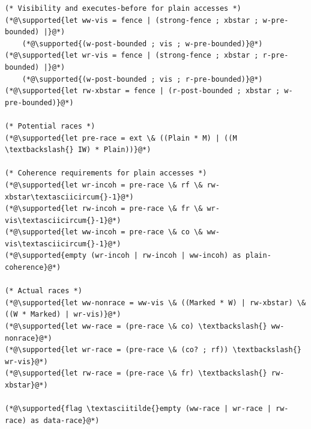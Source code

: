 \begin{lstlisting}
(* Visibility and executes-before for plain accesses *)
(*@\supported{let ww-vis = fence | (strong-fence ; xbstar ; w-pre-bounded) |}@*)
	(*@\supported{(w-post-bounded ; vis ; w-pre-bounded)}@*)
(*@\supported{let wr-vis = fence | (strong-fence ; xbstar ; r-pre-bounded) |}@*)
	(*@\supported{(w-post-bounded ; vis ; r-pre-bounded)}@*)
(*@\supported{let rw-xbstar = fence | (r-post-bounded ; xbstar ; w-pre-bounded)}@*)

(* Potential races *)
(*@\supported{let pre-race = ext \& ((Plain * M) | ((M \textbackslash{} IW) * Plain))}@*)

(* Coherence requirements for plain accesses *)
(*@\supported{let wr-incoh = pre-race \& rf \& rw-xbstar\textasciicircum{}-1}@*)
(*@\supported{let rw-incoh = pre-race \& fr \& wr-vis\textasciicircum{}-1}@*)
(*@\supported{let ww-incoh = pre-race \& co \& ww-vis\textasciicircum{}-1}@*)
(*@\supported{empty (wr-incoh | rw-incoh | ww-incoh) as plain-coherence}@*)

(* Actual races *)
(*@\supported{let ww-nonrace = ww-vis \& ((Marked * W) | rw-xbstar) \& ((W * Marked) | wr-vis)}@*)
(*@\supported{let ww-race = (pre-race \& co) \textbackslash{} ww-nonrace}@*)
(*@\supported{let wr-race = (pre-race \& (co? ; rf)) \textbackslash{} wr-vis}@*)
(*@\supported{let rw-race = (pre-race \& fr) \textbackslash{} rw-xbstar}@*)

(*@\supported{flag \textasciitilde{}empty (ww-race | wr-race | rw-race) as data-race}@*)
\end{lstlisting}

